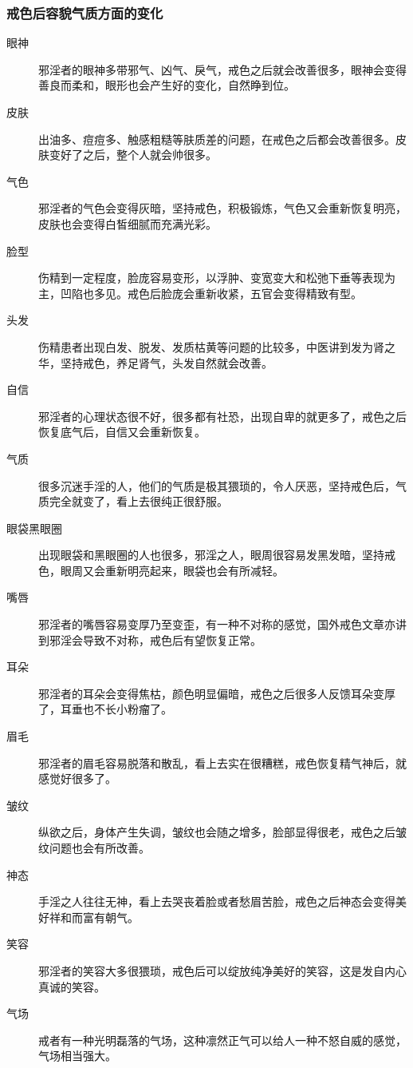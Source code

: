 \subsubsection{戒色后容貌气质方面的变化}

\begin{multicols}{2}
    \begin{description}
        \item[眼神] 邪淫者的眼神多带邪气、凶气、戾气，戒色之后就会改善很多，眼神会变得善良而柔和，眼形也会产生好的变化，自然睁到位。
        \item[皮肤] 出油多、痘痘多、触感粗糙等肤质差的问题，在戒色之后都会改善很多。皮肤变好了之后，整个人就会帅很多。
        \item[气色] 邪淫者的气色会变得灰暗，坚持戒色，积极锻炼，气色又会重新恢复明亮，皮肤也会变得白皙细腻而充满光彩。
        \item[脸型] 伤精到一定程度，脸庞容易变形，以浮肿、变宽变大和松弛下垂等表现为主，凹陷也多见。戒色后脸庞会重新收紧，五官会变得精致有型。
        \item[头发] 伤精患者出现白发、脱发、发质枯黄等问题的比较多，中医讲到发为肾之华，坚持戒色，养足肾气，头发自然就会改善。
        \item[自信] 邪淫者的心理状态很不好，很多都有社恐，出现自卑的就更多了，戒色之后恢复底气后，自信又会重新恢复。
        \item[气质] 很多沉迷手淫的人，他们的气质是极其猥琐的，令人厌恶，坚持戒色后，气质完全就变了，看上去很纯正很舒服。
        \item[眼袋黑眼圈] 出现眼袋和黑眼圈的人也很多，邪淫之人，眼周很容易发黑发暗，坚持戒色，眼周又会重新明亮起来，眼袋也会有所减轻。
        \item[嘴唇] 邪淫者的嘴唇容易变厚乃至变歪，有一种不对称的感觉，国外戒色文章亦讲到邪淫会导致不对称，戒色后有望恢复正常。
        \item[耳朵] 邪淫者的耳朵会变得焦枯，颜色明显偏暗，戒色之后很多人反馈耳朵变厚了，耳垂也不长小粉瘤了。
        \item[眉毛] 邪淫者的眉毛容易脱落和散乱，看上去实在很糟糕，戒色恢复精气神后，就感觉好很多了。
        \item[皱纹] 纵欲之后，身体产生失调，皱纹也会随之增多，脸部显得很老，戒色之后皱纹问题也会有所改善。
        \item[神态] 手淫之人往往无神，看上去哭丧着脸或者愁眉苦脸，戒色之后神态会变得美好祥和而富有朝气。
        \item[笑容] 邪淫者的笑容大多很猥琐，戒色后可以绽放纯净美好的笑容，这是发自内心真诚的笑容。
        \item[气场] 戒者有一种光明磊落的气场，这种凛然正气可以给人一种不怒自威的感觉，气场相当强大。

\end{description}
\end{multicols}
